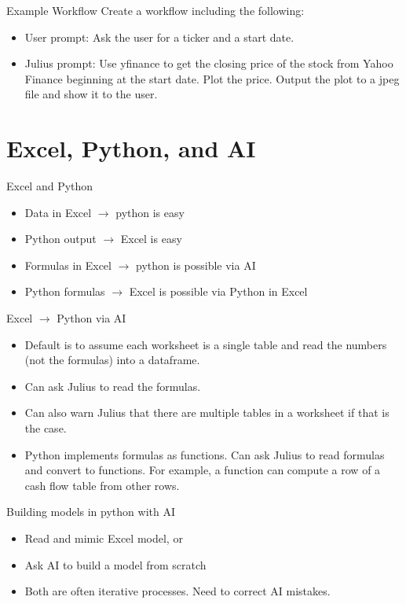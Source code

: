 \documentclass[10pt]{beamer}
\begin{document}
\begin{frame}{Example Workflow}
  Create a workflow including the following:
  \begin{itemize}
  \item User prompt: Ask the user for a ticker and a start date.
  \item Julius prompt: Use yfinance to get the closing price of the stock from Yahoo Finance beginning at the start date.  Plot the price.  Output the plot to a jpeg file and show it to the user.
  \end{itemize}
\end{frame}

\section{Excel, Python, and AI}

\begin{frame}{Excel and Python}
\begin{itemize}
\item Data in Excel $\rightarrow$ python is easy
\item Python output $\rightarrow$ Excel is easy
\item Formulas in Excel $\rightarrow$ python is possible via AI
\item Python formulas $\rightarrow$ Excel is possible via Python in Excel
\end{itemize}
\end{frame}

\begin{frame}{Excel $\rightarrow$ Python via AI}
\begin{itemize}
\item Default is to assume each worksheet is a single table and read the numbers (not the formulas) into a dataframe.
\item Can ask Julius to read the formulas.
\item Can also warn Julius that there are multiple tables in a worksheet if that is the case.
\item Python implements formulas as functions.   Can ask Julius to read formulas and convert to functions.  For example, a function can compute a row of a cash flow table from other rows.
\end{itemize}
\end{frame}

\begin{frame}{Building models in python with AI}
\begin{itemize}
\item Read and mimic Excel model, or
\item Ask AI to build a model from scratch
\item Both are often iterative processes.  Need to correct AI mistakes.
\end{itemize}
\end{frame}
\end{document}
